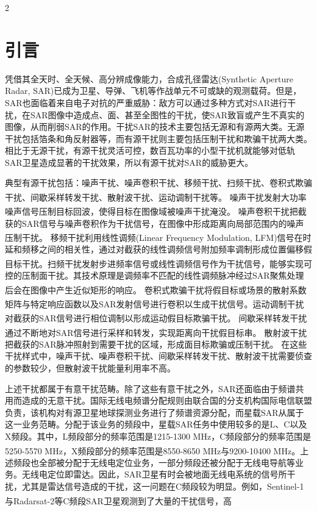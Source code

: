 \documentclass[10.5pt,UTF8]{JR}
\theoremstyle{mystyle}
\newcommand{\upcite}[1]{\textsuperscript{\cite{#1}}}
\begin{document}
\begin{multicols}{2}

\section{引言}

凭借其全天时、全天候、高分辨成像能力，合成孔径雷达(Synthetic Aperture Radar, SAR)已成为卫星、导弹、飞机等作战单元不可或缺的观测载荷。但是，SAR也面临着来自电子对抗的严重威胁：敌方可以通过多种方式对SAR进行干扰，在SAR图像中造成点、面、甚至全图性的干扰，使SAR致盲或产生不真实的图像，从而削弱SAR的作用。干扰SAR的技术主要包括无源和有源两大类。无源干扰包括箔条和角反射器等，而有源干扰则主要包括压制干扰和欺骗干扰两大类。相比于无源干扰，有源干扰灵活可控，数百瓦功率的小型干扰机就能够对低轨SAR卫星造成显著的干扰效果，所以有源干扰对SAR的威胁更大。

典型有源干扰包括：噪声干扰、噪声卷积干扰、移频干扰、扫频干扰、卷积式欺骗干扰、间歇采样转发干扰、散射波干扰、运动调制干扰等\upcite{li2020hc,wu2010hczs,chen2022jy}。
噪声干扰\upcite{lb2004hc,wu2010hczs}发射大功率噪声信号压制目标回波，使得目标在图像域被噪声干扰淹没。
噪声卷积干扰\upcite{lv2008dsar}把截获的SAR信号与噪声卷积作为干扰信号，在图像中形成距离向局部范围内的噪声压制干扰。
移频干扰\upcite{huang2006dhc,huang2007dhc}利用线性调频(Linear Frequency Modulation, LFM)信号在时延和频移之间的相关性，通过对截获的线性调频信号附加频率调制形成位置偏移假目标干扰。扫频干扰\upcite{huang2011dhc}发射步进频率信号或线性调频信号作为干扰信号，能够实现可控的压制面干扰。其技术原理是调频率不匹配的线性调频脉冲经过SAR聚焦处理后会在图像中产生近似矩形的响应。
卷积式欺骗干扰\upcite{liu0SAR}将假目标或场景的散射系数矩阵与特定响应函数以及SAR发射信号进行卷积以生成干扰信号。运动调制干扰\upcite{wu2010jy,wu2012SAR}对截获的SAR信号进行相位调制以形成运动假目标欺骗干扰。
间歇采样转发干扰\upcite{wang2006js,wu2010dsar}通过不断地对SAR信号进行采样和转发，实现距离向干扰假目标串。
散射波干扰\upcite{hu2002hc}把截获的SAR脉冲照射到需要干扰的区域，形成面目标欺骗或压制干扰。
在这些干扰样式中，噪声干扰、噪声卷积干扰、间歇采样转发干扰、散射波干扰需要侦查的参数较少，但散射波干扰能量利用率不高。

上述干扰都属于有意干扰范畴。除了这些有意干扰之外，SAR还面临由于频谱共用而造成的无意干扰。国际无线电频谱分配规则由联合国的分支机构国际电信联盟负责，该机构对有源卫星地球探测业务进行了频谱资源分配，而星载SAR从属于这一业务范畴。分配于该业务的频段中，星载SAR任务中使用较多的是L、C以及X频段。其中，L频段部分的频率范围是1215-1300 MHz，C频段部分的频率范围是5250-5570 MHz，X频段部分的频率范围是8550-8650 MHz与9200-10400 MHz\upcite{ITUrg}。上述频段也全部被分配于无线电定位业务，一部分频段还被分配于无线电导航等业务。无线电定位即雷达。因此，SAR卫星有时会被地面无线电系统的信号所干扰，尤其是雷达信号造成的干扰，这一问题在C频段较为明显。例如，Sentinel-1与Radarsat-2等C频段SAR卫星观测到了大量的干扰信号\upcite{taoMitigationRadioFrequency2019,yang2020mutual,yang2021bsf}，高
\end{multicols}
\twocolumn 
\end{document}
